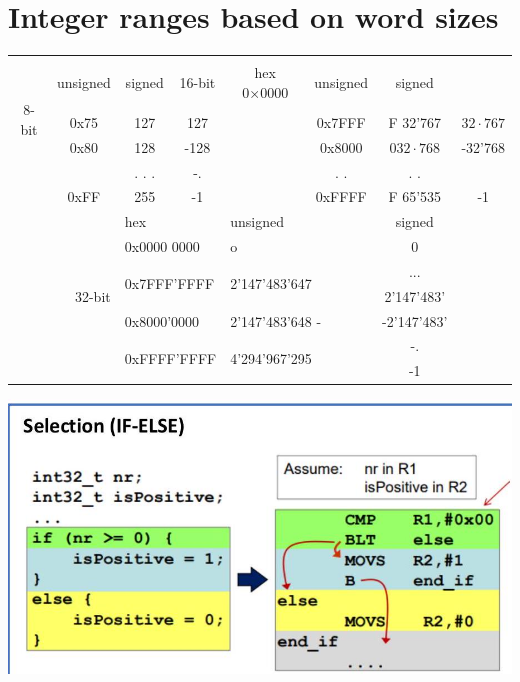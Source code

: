 \documentclass[10pt]{article}
\begin{document}
\section*{Integer ranges based on word sizes}
\begin{center}
\begin{tabular}{|c|c|c|c|c|c|c|c|}
\hline
\multirow[t]{6}{*}{8-bit} & \( \begin{gathered} \text { hex } \\ 0 \times 00 \end{gathered} \) & unsigned & signed & 16-bit & hex 0×0000 & unsigned & signed \\
\hline
 &  &  &  &  &  &  &  \\
\hline
 & 0x75 & 127 & 127 &  & 0x7FFF & F 32'767 & $32 \cdot 767$ \\
\hline
 & 0x80 & 128 & -128 &  & 0x8000 & $032 \cdot 768$ & -32'768 \\
\hline
 &  & . . . & -. &  & . . & . . &  \\
\hline
 & 0xFF & 255 & -1 &  & 0xFFFF & F 65'535 & -1 \\
\hline
\multicolumn{2}{|r|}{\multirow[t]{7}{*}{32-bit}} & \multicolumn{2}{|l|}{hex} & \multicolumn{2}{|l|}{unsigned} & signed &  \\
\hline
 &  & \multicolumn{2}{|l|}{0x0000 0000} & \multicolumn{2}{|l|}{o} & 0 &  \\
\hline
 &  & \multicolumn{2}{|l|}{\multirow[t]{2}{*}{0x7FFF'FFFF}} & \multicolumn{2}{|l|}{\multirow[t]{2}{*}{2'147'483'647}} & ... &  \\
\hline
 &  &  &  &  &  & 2'147'483' &  \\
\hline
 &  & \multicolumn{2}{|l|}{0x8000'0000} & \multicolumn{2}{|l|}{2'147'483'648 -} & -2'147'483' &  \\
\hline
 &  & \multicolumn{2}{|l|}{\multirow[t]{2}{*}{0xFFFF'FFFF}} & \multicolumn{2}{|l|}{\multirow[t]{2}{*}{4'294'967'295}} & -. &  \\
\hline
 &  &  &  &  &  & -1 &  \\
\hline
\end{tabular}
\end{center}

\begin{center}
\includegraphics[max width=\textwidth]{2024_12_29_79e6b22f503fb7b4f718g-07(3)}
\end{center}
\end{document}
